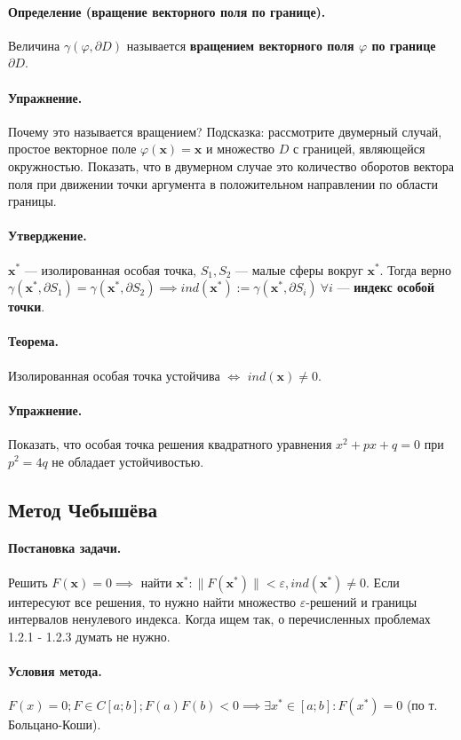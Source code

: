 \paragraph{Определение (вращение векторного поля по границе).} Величина $\gamma(\varphi, \partial D)$ называется \textbf{вращением векторного поля $\varphi$ по границе $\partial D$}.
\paragraph{Упражнение.} Почему это называется вращением? Подсказка: рассмотрите двумерный случай, простое векторное поле $\varphi(\mathbf{x}) = \mathbf{x}$ и множество $D$ с границей, являющейся окружностью. Показать, что в двумерном случае это количество оборотов вектора поля при движении точки аргумента в положительном направлении по области границы.
\paragraph{Утверджение.} $\mathbf{x}^*$ --- изолированная особая точка, $S_1, S_2$ --- малые сферы вокруг $\mathbf{x}^*$. Тогда верно $\gamma(\mathbf{x}^*, \partial S_1) = \gamma(\mathbf{x}^*, \partial S_2) \implies ind(\mathbf{x}^*) := \gamma(\mathbf{x}^*, \partial S_i) \ \forall i$ --- \textbf{индекс особой точки}.
\paragraph{Теорема.} Изолированная особая точка устойчива $\iff$ $ind(\mathbf{x}) \neq 0$.
\paragraph{Упражнение.} Показать, что особая точка решения квадратного уравнения $x^2+px+q=0$ при $p^2=4q$ не обладает устойчивостью.
\subsection{Метод Чебышёва}
\paragraph{Постановка задачи.}
Решить $F(\mathbf{x}) = 0 \implies$ найти $\mathbf{x}^*: \|F(\mathbf{x}^*)\|<\varepsilon, ind(\mathbf{x}^*) \neq 0$.
Если интересуют все решения, то нужно найти множество $\varepsilon$-решений и границы интервалов ненулевого индекса.
Когда ищем так, о перечисленных проблемах 1.2.1 - 1.2.3 думать не нужно.
\paragraph{Условия метода.}
$F(x)=0; F \in C[a; b]; F(a)F(b) < 0 \implies \exists x^* \in [a; b]: F(x^*)=0$ (по т. Больцано-Коши).

